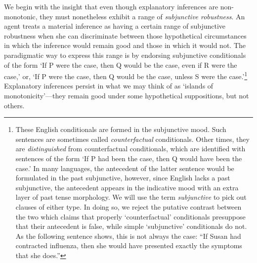 \documentclass{svjour3}                     %
\begin{document}
We begin with the insight that even though explanatory inferences are non-monotonic, they must nonetheless exhibit a range of \textit{subjunctive robustness}. An agent treats a material inference as having a certain range of subjunctive robustness when she can discriminate between those hypothetical circumstances in which the inference would remain good and those in which it would not. The paradigmatic way to express this range is by endorsing subjunctive conditionals of the form `If P were the case, then Q would be the case, even if R were the case,' or, `If P were the case, then Q would be the case, unless S were the case.'\footnote{These English conditionals are formed in the subjunctive mood. Such sentences are sometimes called \textit{counterfactual} conditionals. Other times, they are \textit{distinguished} from counterfactual conditionals, which are identified with sentences of the form `If P had been the case, then Q would have been the case.' In many languages, the antecedent of the latter sentence would be formulated in the past subjunctive, however, since English lacks a past subjunctive, the antecedent appears in the indicative mood with an extra layer of past tense morphology. We will use the term \textit{subjunctive} to pick out clauses of either type. In doing so, we reject the putative contrast between the two which claims that properly `counterfactual' conditionals presuppose that their antecedent is false, while simple `subjunctive' conditionals do not. As the following sentence shows, this is not always the case: ``If Susan had contracted influenza, then she would have presented exactly the symptoms that she does.''} Explanatory inferences persist in what we may think of as `islands of monotonicity'---they remain good under some hypothetical suppositions, but not others. 
\end{document}
